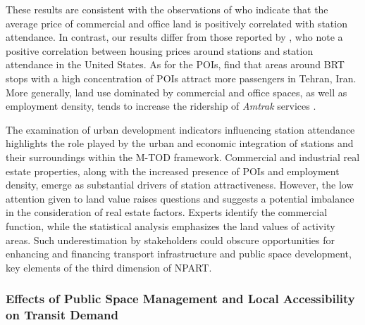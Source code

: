\begin{refsegment}
These results are consistent with the observations of \textcolor{blue}{\textcite[11]{amini_pishro_node_2022}} who indicate that the average price of commercial and office land is positively correlated with station attendance. In contrast, our results differ from those reported by \textcolor{blue}{\textcite[9]{cummings_does_2022}}, who note a positive correlation between housing prices around stations and station attendance in the United States. As for the \acrshort{POIs}, \textcolor{blue}{\textcite[5]{pezeshknejad_evaluating_2020}} find that areas around \acrshort{BRT} stops with a high concentration of \acrshort{POIs} attract more passengers in Tehran, Iran. More generally, land use dominated by commercial and office spaces, as well as employment density, tends to increase the ridership of \textsl{Amtrak} services \textcolor{blue}{\autocite[8]{cummings_does_2022}}.%

The examination of urban development indicators influencing station attendance highlights the role played by the urban and economic integration of stations and their surroundings within the \acrshort{M-TOD} framework. Commercial and industrial real estate properties, along with the increased presence of \acrshort{POIs} and employment density, emerge as substantial drivers of station attractiveness. However, the low attention given to land value raises questions and suggests a potential imbalance in the consideration of real estate factors. Experts identify the commercial function, while the statistical analysis emphasizes the land values of activity areas. Such underestimation by stakeholders could obscure opportunities for enhancing and financing transport infrastructure and public space development, key elements of the third dimension of \acrshort{NPART}.%

\subsubsection*{Effects of Public Space Management and Local Accessibility on Transit Demand
    \label{chap6:results-influence-indicateurs-accessibility}
    }


\end{refsegment}
